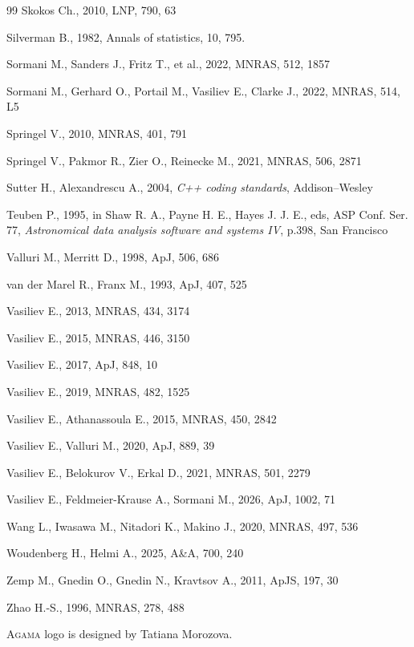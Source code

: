 \documentclass[12pt]{article}
\newcommand{\Agama}{\textsc{Agama}\xspace}
\begin{document}
\begin{thebibliography}{99}
Skokos Ch., 2010, LNP, 790, 63

Silverman B., 1982, Annals of statistics, 10, 795.

Sormani M., Sanders J., Fritz T., et al., 2022, MNRAS, 512, 1857

Sormani M., Gerhard O., Portail M., Vasiliev E., Clarke J., 2022, MNRAS, 514, L5

Springel V., 2010, MNRAS, 401, 791

Springel V., Pakmor R., Zier O., Reinecke M., 2021, MNRAS, 506, 2871

Sutter H., Alexandrescu A., 2004, \textsl{C++ coding standards}, Addison--Wesley

Teuben P., 1995, in Shaw R. A., Payne H. E., Hayes J. J. E., eds, ASP Conf. Ser. 77,
\textsl{Astronomical data analysis software and systems IV}, p.398, San Francisco

Valluri M., Merritt D., 1998, ApJ, 506, 686

van der Marel R., Franx M., 1993, ApJ, 407, 525

Vasiliev E., 2013, MNRAS, 434, 3174

Vasiliev E., 2015, MNRAS, 446, 3150

Vasiliev E., 2017, ApJ, 848, 10

Vasiliev E., 2019, MNRAS, 482, 1525

Vasiliev E., Athanassoula E., 2015, MNRAS, 450, 2842

Vasiliev E., Valluri M., 2020, ApJ, 889, 39

Vasiliev E., Belokurov V., Erkal D., 2021, MNRAS, 501, 2279

Vasiliev E., Feldmeier-Krause A., Sormani M., 2026, ApJ, 1002, 71

Wang L., Iwasawa M., Nitadori K., Makino J., 2020, MNRAS, 497, 536

Woudenberg H., Helmi A., 2025, A\&A, 700, 240

Zemp M., Gnedin O., Gnedin N., Kravtsov A., 2011, ApJS, 197, 30

Zhao H.-S., 1996, MNRAS, 278, 488

\end{thebibliography}

\vspace{-3mm}\noindent \Agama logo is designed by Tatiana Morozova.
\end{document}
